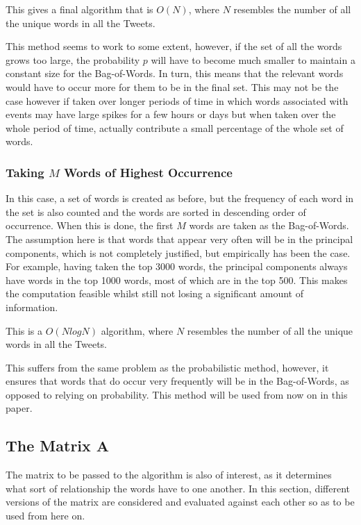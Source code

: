 \documentclass[11pt,a4paper]{article}
\begin{document}
This gives a final algorithm that is $O(N)$, where $N$ resembles the number of all the unique words in all the Tweets. 

This method seems to work to some extent, however, if the set of all the words grows too large, the probability $p$ will have to become much smaller to maintain a constant size for the Bag-of-Words. In turn, this means that the relevant words would have to occur more for them to be in the final set. This may not be the case however if taken over longer periods of time in which words associated with events may have large spikes for a few hours or days but when taken over the whole period of time, actually contribute a small percentage of the whole set of words.

\subsubsection{Taking $M$ Words of Highest Occurrence}

In this case, a set of words is created as before, but the frequency of each word in the set is also counted and the words are sorted in descending order of occurrence. When this is done, the first $M$ words are taken as the Bag-of-Words. The assumption here is that words that appear very often will be in the principal components, which is not completely justified, but empirically has been the case. For example, having taken the top 3000 words, the principal components always have words in the top 1000 words, most of which are in the top 500. This makes the computation feasible whilst still not losing a significant amount of information.

This is a $O(NlogN)$ algorithm, where $N$ resembles the number of all the unique words in all the Tweets. 

This suffers from the same problem as the probabilistic method, however, it ensures that words that do occur very frequently will be in the Bag-of-Words, as opposed to relying on probability. This method will be used from now on in this paper.

\subsection{The Matrix $\mathbf{A}$}

The matrix to be passed to the algorithm is also of interest, as it determines what sort of relationship the words have to one another. In this section, different versions of the matrix are considered and evaluated against each other so as to be used from here on. 
\end{document}
